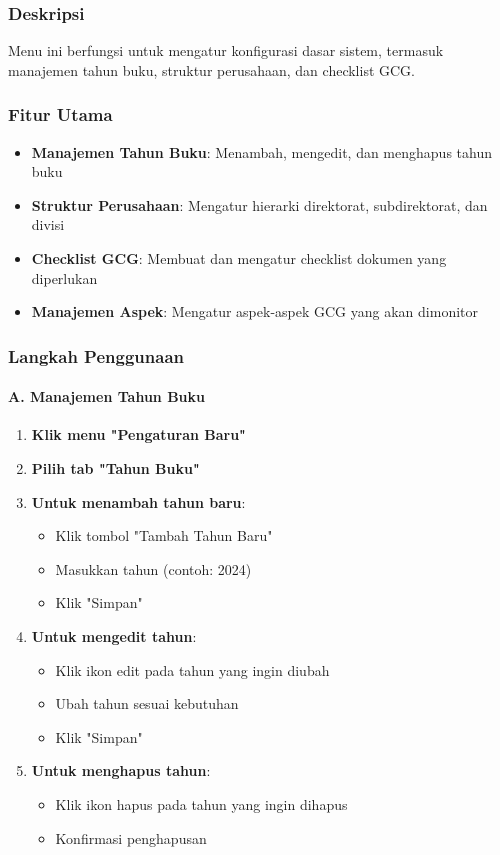 \documentclass[12pt,a4paper]{article}
\begin{document}
\subsubsection{Deskripsi}
Menu ini berfungsi untuk mengatur konfigurasi dasar sistem, termasuk manajemen tahun buku, struktur perusahaan, dan checklist GCG.

\subsubsection{Fitur Utama}
\begin{itemize}
    \item \textbf{Manajemen Tahun Buku}: Menambah, mengedit, dan menghapus tahun buku
    \item \textbf{Struktur Perusahaan}: Mengatur hierarki direktorat, subdirektorat, dan divisi
    \item \textbf{Checklist GCG}: Membuat dan mengatur checklist dokumen yang diperlukan
    \item \textbf{Manajemen Aspek}: Mengatur aspek-aspek GCG yang akan dimonitor
\end{itemize}

\subsubsection{Langkah Penggunaan}

\paragraph{A. Manajemen Tahun Buku}
\begin{enumerate}
    \item \textbf{Klik menu "Pengaturan Baru"}
    \item \textbf{Pilih tab "Tahun Buku"}
    \item \textbf{Untuk menambah tahun baru}:
    \begin{itemize}
        \item Klik tombol "Tambah Tahun Baru"
        \item Masukkan tahun (contoh: 2024)
        \item Klik "Simpan"
    \end{itemize}
    \item \textbf{Untuk mengedit tahun}:
    \begin{itemize}
        \item Klik ikon edit pada tahun yang ingin diubah
        \item Ubah tahun sesuai kebutuhan
        \item Klik "Simpan"
    \end{itemize}
    \item \textbf{Untuk menghapus tahun}:
    \begin{itemize}
        \item Klik ikon hapus pada tahun yang ingin dihapus
        \item Konfirmasi penghapusan
    \end{itemize}
\end{enumerate}
\end{document}
